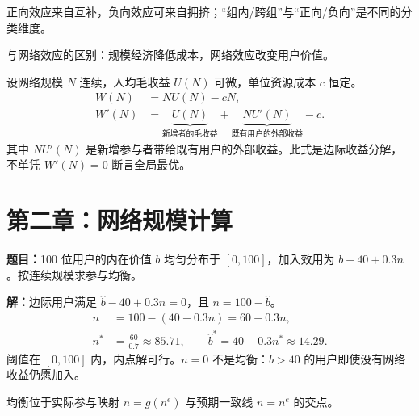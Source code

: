 \documentclass[12pt,a4paper,fontset=none]{ctexart}
\begin{document}
正向效应来自互补，负向效应可来自拥挤；“组内/跨组”与“正向/负向”是不同的分类维度。

与网络效应的区别：规模经济降低成本，网络效应改变用户价值。

\label{kp:marginal-benefit}
\begin{proofbox}[title=推导]
设网络规模 $N$ 连续，人均毛收益 $U(N)$ 可微，单位资源成本 $c$ 恒定。
\begin{align*}
  W(N)&=NU(N)-cN,\\
  W'(N)&=\underbrace{U(N)}_{\text{新增者的毛收益}}
    +\underbrace{NU'(N)}_{\text{既有用户的外部收益}}-c.
\end{align*}
其中 $NU'(N)$ 是新增参与者带给既有用户的外部收益。此式是边际收益分解，不单凭 $W'(N)=0$ 断言全局最优。
\end{proofbox}

\section{第二章：网络规模计算}

\label{kp:network-size}
\begin{examplebox}[title=例题]
\textbf{题目：}100 位用户的内在价值 $b$ 均匀分布于 $[0,100]$，加入效用为 $b-40+0.3n$。按连续规模求参与均衡。

\textbf{解：}边际用户满足 $\hat b-40+0.3n=0$，且 $n=100-\hat b$。
\begin{align*}
  n&=100-(40-0.3n)=60+0.3n,\\
  n^*&=\frac{60}{0.7}\approx85.71,\qquad
  \hat b^*=40-0.3n^*\approx14.29.
\end{align*}
阈值在 $[0,100]$ 内，内点解可行。$n=0$ 不是均衡：$b>40$ 的用户即使没有网络收益仍愿加入。

\begin{center}
\end{center}
均衡位于实际参与映射 $n=g(n^e)$ 与预期一致线 $n=n^e$ 的交点。
\end{examplebox}


\end{document}
